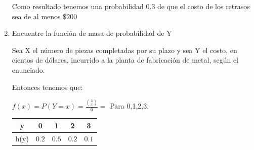 \documentclass{article}\usepackage[]{graphicx}\usepackage[]{color}
\begin{document}
\begin{enumerate}
Como resultado tenemos una probabilidad $0.3$ de que el costo de los retrasos sea de al menos $ \$200 $

    \item Encuentre la función de masa de probabilidad de Y
    
Sea X el número de piezas completadas por su plazo y sea Y el costo, en cientos de dólares, incurrido a la planta de fabricación de metal, según el enunciado.

Entonces tenemos que:


\begin{center}
$f(x)=P(Y=x)= \frac{\binom{3}{x} }{6}=$ Para 0,1,2,3.
\end{center}

\begin{center}
\begin{table}[h]
\centering
\def\arraystretch{1.5}
\begin{tabular}{c|c c c c }
y & 0 & 1 & 2 & 3\\ \hline
h(y) & $0.2$ & $0.5$ & $0.2$ & $0.1$
\end{tabular}
\end{table}
\end{center}
\end{enumerate}
\end{document}
